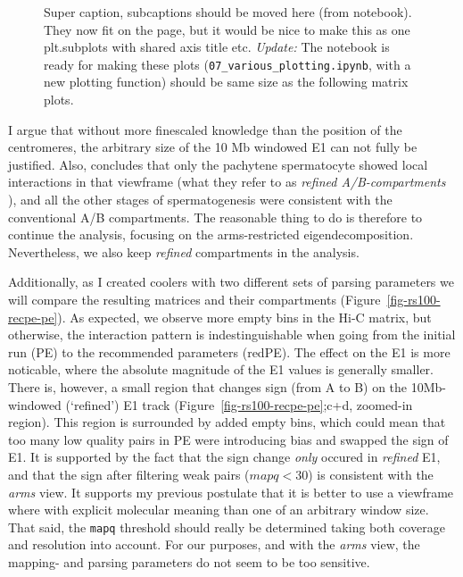 \documentclass[
  11pt,
  a4paper,
]{scrbook}
\let\oldemph\emph
\renewcommand\emph[1]{\oldemph{\color{gray}#1}}
\begin{document}
\begin{figure}[H]
\begin{minipage}{0.48\linewidth}
{}


\end{minipage}%

\caption{\label{fig-e1-matrix-full-arms-10mb-round-spermatid}Super
caption, subcaptions should be moved here (from notebook). They now fit
on the page, but it would be nice to make this as one plt.subplots with
shared axis title etc. \emph{Update:} The notebook is ready for making
these plots (\texttt{07\_various\_plotting.ipynb}, with a new plotting
function) should be same size as the following matrix plots.}

\end{figure}%

I argue that without more finescaled knowledge than the position of the
centromeres, the arbitrary size of the 10 Mb windowed E1 can not fully
be justified. Also, \citet{wang_reprogramming_2019} concludes that only
the pachytene spermatocyte showed local interactions in that viewframe
(what they refer to as \emph{refined A/B-compartments} ), and all the
other stages of spermatogenesis were consistent with the conventional
A/B compartments. The reasonable thing to do is therefore to continue
the analysis, focusing on the arms-restricted eigendecomposition.
Nevertheless, we also keep \emph{refined} compartments in the analysis.

Additionally, as I created coolers with two different sets of parsing
parameters we will compare the resulting matrices and their compartments
(Figure~\ref{fig-rs100-recpe-pe}). As expected, we observe more empty
bins in the Hi-C matrix, but otherwise, the interaction pattern is
indestinguishable when going from the initial run (PE) to the
recommended parameters (redPE). The effect on the E1 is more noticable,
where the absolute magnitude of the E1 values is generally smaller.
There is, however, a small region that changes sign (from A to B) on the
10Mb-windowed (`refined') E1 track (Figure~\ref{fig-rs100-recpe-pe};c+d,
zoomed-in region). This region is surrounded by added empty bins, which
could mean that too many low quality pairs in PE were introducing bias
and swapped the sign of E1. It is supported by the fact that the sign
change \emph{only} occured in \emph{refined} E1, and that the sign after
filtering weak pairs (\(mapq < 30\)) is consistent with the \emph{arms}
view. It supports my previous postulate that it is better to use a
viewframe where with explicit molecular meaning than one of an arbitrary
window size. That said, the \texttt{mapq} threshold should really be
determined taking both coverage and resolution into account. For our
purposes, and with the \emph{arms} view, the mapping- and parsing
parameters do not seem to be too sensitive.
\end{document}
